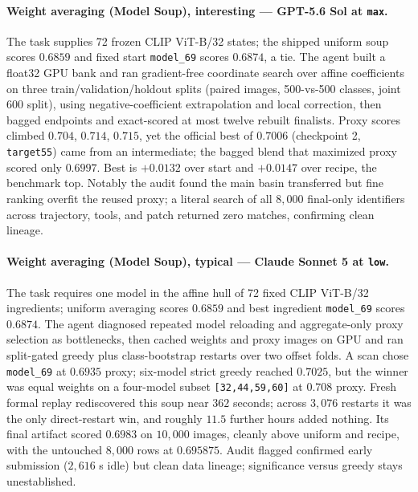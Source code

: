 \paragraph{Weight averaging (Model Soup), interesting --- GPT-5.6 Sol at \texttt{max}.} The task supplies 72 frozen CLIP ViT-B/32 states; the shipped uniform soup scores $0.6859$ and fixed start \texttt{model\_69} scores $0.6874$, a tie. The agent built a float32 GPU bank and ran gradient-free coordinate search over affine coefficients on three train/validation/holdout splits (paired images, 500-vs-500 classes, joint 600 split), using negative-coefficient extrapolation and local correction, then bagged endpoints and exact-scored at most twelve rebuilt finalists. Proxy scores climbed $0.704$, $0.714$, $0.715$, yet the official best of $0.7006$ (checkpoint 2, \texttt{target55}) came from an intermediate; the bagged blend that maximized proxy scored only $0.6997$. Best is $+0.0132$ over start and $+0.0147$ over recipe, the benchmark top. Notably the audit found the main basin transferred but fine ranking overfit the reused proxy; a literal search of all $8{,}000$ final-only identifiers across trajectory, tools, and patch returned zero matches, confirming clean lineage.

\paragraph{Weight averaging (Model Soup), typical --- Claude Sonnet 5 at \texttt{low}.} The task requires one model in the affine hull of 72 fixed CLIP ViT-B/32 ingredients; uniform averaging scores $0.6859$ and best ingredient \texttt{model\_69} scores $0.6874$. The agent diagnosed repeated model reloading and aggregate-only proxy selection as bottlenecks, then cached weights and proxy images on GPU and ran split-gated greedy plus class-bootstrap restarts over two offset folds. A scan chose \texttt{model\_69} at $0.6935$ proxy; six-model strict greedy reached $0.7025$, but the winner was equal weights on a four-model subset \texttt{[32,44,59,60]} at $0.708$ proxy. Fresh formal replay rediscovered this soup near $362$ seconds; across $3{,}076$ restarts it was the only direct-restart win, and roughly $11.5$ further hours added nothing. Its final artifact scored $0.6983$ on $10{,}000$ images, cleanly above uniform and recipe, with the untouched $8{,}000$ rows at $0.695875$. Audit flagged confirmed early submission ($2{,}616$ s idle) but clean data lineage; significance versus greedy stays unestablished.

